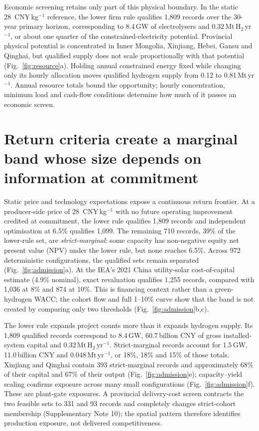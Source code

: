 \documentclass[pdflatex,sn-nature]{sn-jnl}
\newcommand{\cnykg}{CNY\,kg$^{-1}$}
\begin{document}
Economic screening retains only part of this physical boundary. In the static 28~\cnykg{} reference, the lower firm rule qualifies 1,809 records over the 30-year primary horizon, corresponding to 8.4\,GW of electrolysers and 0.32\,Mt\,H$_2$\,yr$^{-1}$, or about one quarter of the constrained-electricity potential. Provincial physical potential is concentrated in Inner Mongolia, Xinjiang, Hebei, Gansu and Qinghai, but qualified supply does not scale proportionally with that potential (Fig.~\ref{fig:resource}a). Holding annual constrained energy fixed while changing only its hourly allocation moves qualified hydrogen supply from 0.12 to 0.81\,Mt\,yr$^{-1}$. Annual resource totals bound the opportunity; hourly concentration, minimum load and cash-flow conditions determine how much of it passes an economic screen.

\section*{Return criteria create a marginal band whose size depends on information at commitment}

Static price and technology expectations expose a continuous return frontier. At a producer-side price of 28~\cnykg{} with no future operating improvement credited at commitment, the lower rule qualifies 1,809 records and independent optimisation at 6.5\% qualifies 1,099. The remaining 710 records, 39\% of the lower-rule set, are \emph{strict-marginal}: some capacity has non-negative equity net present value (NPV) under the lower rule, but none reaches 6.5\%. Across 972 deterministic configurations, the qualified sets remain separated (Fig.~\ref{fig:admission}a). At the IEA's 2021 China utility-solar cost-of-capital estimate (4.9\% nominal), exact revaluation qualifies 1,255 records, compared with 1,036 at 8\% and 874 at 10\%\cite{ieacapital}. This is financing context rather than a green-hydrogen WACC; the cohort flow and full 1--10\% curve show that the band is not created by comparing only two thresholds (Fig.~\ref{fig:admission}b,c).

The lower rule expands project counts more than it expands hydrogen supply. Its 1,809 qualified records correspond to 8.4\,GW, 60.7\,billion CNY of gross installed-system capital and 0.32\,Mt\,H$_2$\,yr$^{-1}$. Strict-marginal records account for 1.5\,GW, 11.0\,billion CNY and 0.048\,Mt\,yr$^{-1}$, or 18\%, 18\% and 15\% of those totals. Xinjiang and Qinghai contain 393 strict-marginal records and approximately 68\% of their capital and 67\% of their output (Fig.~\ref{fig:admission}e); capacity--yield scaling confirms exposure across many small configurations (Fig.~\ref{fig:admission}f). These are plant-gate exposures. A provincial delivery-cost screen\cite{bi2026} contracts the two feasible sets to 331 and 93 records and completely changes strict-cohort membership (Supplementary Note 10); the spatial pattern therefore identifies production exposure, not delivered competitiveness.
\end{document}

